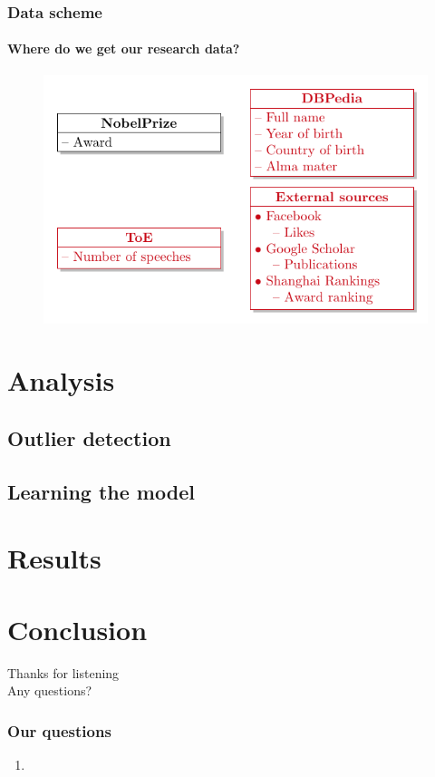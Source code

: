 \documentclass[nonav,sleutel]{beamer}
\begin{document}
\begin{frame}
\frametitle{Data scheme}
\framesubtitle{Where do we get our \textbf{research} data?}

\begin{figure}
	\includegraphics{images/dataschema_research}
\end{figure}

\end{frame}


\section{Analysis}

\subsection{Outlier detection}
\subsection{Learning the model}

\section{Results}

\section{Conclusion}
\begin{frame}
\begin{center}
\Large{Thanks for listening}\\
Any questions?
\end{center}

\end{frame}

\begin{frame}
\frametitle{Our questions}
\begin{enumerate}
\item 
\end{enumerate}
\end{frame}
\end{document}
